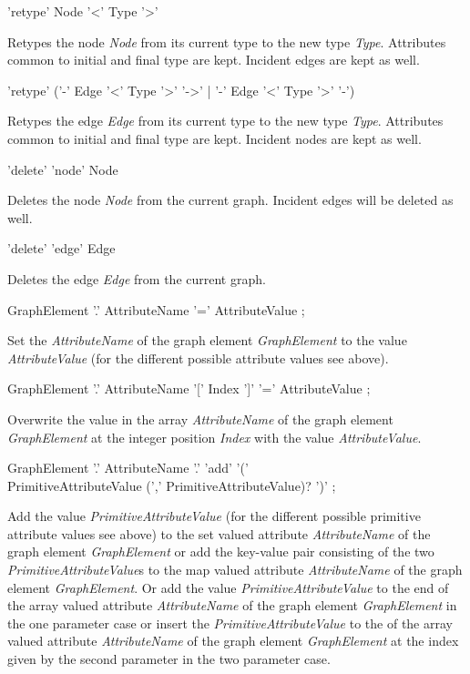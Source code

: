 \begin{rail}
  'retype' Node '<' Type '>'
\end{rail}
Retypes the node \emph{Node} from its current type to the new type \emph{Type}. Attributes common to initial and final type are kept. Incident edges are kept as well. 

\begin{rail}
  'retype' ('-' Edge '<' Type '>' '->' | '-' Edge '<' Type '>' '-')
\end{rail}
Retypes the edge \emph{Edge} from its current type to the new type \emph{Type}. Attributes common to initial and final type are kept. Incident nodes are kept as well.

\begin{rail}
  'delete' 'node' Node
\end{rail}
Deletes the node \emph{Node} from the current graph.
Incident edges will be deleted as well.

\begin{rail}
  'delete' 'edge' Edge
\end{rail}
Deletes the edge \emph{Edge} from the current graph.

\begin{rail}
  GraphElement '.' AttributeName '=' AttributeValue ;
\end{rail}
Set the  \emph{AttributeName} of the graph element \emph{GraphElement} to the value \emph{AttributeValue} (for the different possible attribute values see above).

\begin{rail}
  GraphElement '.' AttributeName '[' Index ']' '=' AttributeValue ;
\end{rail}
Overwrite the value in the array  \emph{AttributeName} of the graph element \emph{GraphElement} at the integer position \emph{Index} with the value \emph{AttributeValue}.

\begin{rail}
  GraphElement '.' AttributeName '.' 'add' '(' \\
  	PrimitiveAttributeValue (',' PrimitiveAttributeValue)? ')' ;
\end{rail}
Add the value \emph{PrimitiveAttributeValue} (for the different possible primitive attribute values see above) to the set valued attribute \emph{AttributeName} of the graph element \emph{GraphElement} or add the key-value pair consisting of the two \emph{PrimitiveAttributeValue}s to the map valued attribute \emph{AttributeName} of the graph element \emph{GraphElement}.
Or add the value \emph{PrimitiveAttributeValue} to the end of the array valued attribute \emph{AttributeName} of the graph element \emph{GraphElement} in the one parameter case or insert the \emph{PrimitiveAttributeValue} to the of the array valued attribute \emph{AttributeName} of the graph element \emph{GraphElement} at the index given by the second parameter in the two parameter case.

